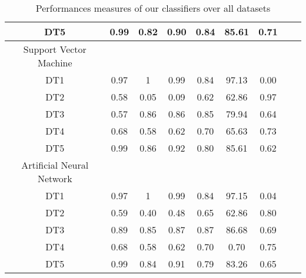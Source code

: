 \begin{table}[!ht]
\begin{tabular}{*{7}{c}l r}
  DT5 &0.99 &0.82&0.90&0.84&85.61&0.71\\
  \hline
Support Vector Machine   & & & & & &  \\   
DT1 &0.97 &1   &0.99 &0.84 &97.13&0.00 \\
  DT2 &0.58  &0.05   & 0.09&0.62&62.86&0.97\\
  DT3 &0.57 & 0.86&0.86&0.85&79.94&0.64\\
  DT4 & 0.68&0.58&0.62&0.70&65.63&0.73\\
  DT5 &0.99 &0.86&0.92&0.80&85.61&0.62\\
   \hline
Artificial Neural Network   & & & & & &  \\  
DT1 &0.97&1 &0.99   &0.84 &97.15&0.04  \\
  DT2 &0.59  &0.40   &0.48&0.65&62.86&0.80 \\
  DT3 &0.89 &0.85 &0.87&0.87&86.68&0.69\\
  DT4 &0.68 &0.58&0.62&0.70&0.70&0.75\\
  DT5 &0.99 &0.84&0.91&0.79&83.26&0.65\\ 
\bottomrule
\end{tabular}
\caption{Performances measures of our classifiers over all datasets}\label{perf-measure-dt1}
\end{table}

